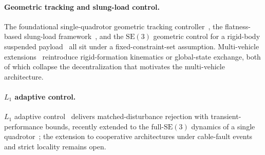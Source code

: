 \paragraph{Geometric tracking and slung-load control.} The foundational single-quadrotor geometric tracking controller~\cite{LeeLeokMcClamroch2010}, the flatness-based slung-load framework~\cite{Sreenath2013}, and the $\mathrm{SE}(3)$ geometric control for a rigid-body suspended payload~\cite{Lee2018} all sit under a fixed-constraint-set assumption. Multi-vehicle extensions~\cite{LeeSreenathKumar2013, SharmaSundaram2023} reintroduce rigid-formation kinematics or global-state exchange, both of which collapse the decentralization that motivates the multi-vehicle architecture.

\paragraph{$L_1$ adaptive control.} $L_1$ adaptive control~\cite{CaoHovakimyan2008, Hovakimyan2010book} delivers matched-disturbance rejection with transient-performance bounds, recently extended to the full-$\mathrm{SE}(3)$ dynamics of a single quadrotor~\cite{WuCheng2025}; the extension to cooperative architectures under cable-fault events and strict locality remains open.

